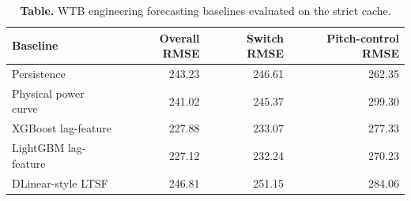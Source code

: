 \begin{table}[t]
\centering
\footnotesize
\setlength{\tabcolsep}{5pt}
\renewcommand{\arraystretch}{1.08}
\caption*{\textbf{Table.} WTB engineering forecasting baselines evaluated on the strict cache.}
\begin{tabular}{lrrr}
\toprule
Baseline & Overall RMSE & Switch RMSE & Pitch-control RMSE \\
\midrule
Persistence & 243.23 & 246.61 & 262.35 \\
Physical power curve & 241.02 & 245.37 & 299.30 \\
XGBoost lag-feature & 227.88 & 233.07 & 277.33 \\
LightGBM lag-feature & 227.12 & 232.24 & 270.23 \\
DLinear-style LTSF & 246.81 & 251.15 & 284.06 \\
\bottomrule
\end{tabular}
\end{table}
